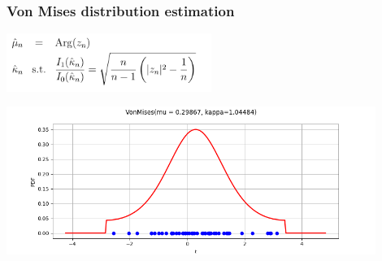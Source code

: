 \documentclass{beamer}
\begin{document}
\begin{frame}[containsverbatim]
\frametitle{Von Mises distribution estimation}





\begin{center}
\includegraphics[width=0.5\textwidth]{figures/vm.png}
\end{center}

\begin{center}
\includegraphics[width=0.9\textwidth]{figures/openturns-VonMisesFactory-1.png}
\end{center}

\end{frame}
\end{document}
